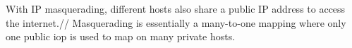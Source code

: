 With IP masquerading, different hosts also share a public IP address to access the internet.//
Masquerading is essentially a many-to-one mapping where only one public iop is used to map on many private hosts.
